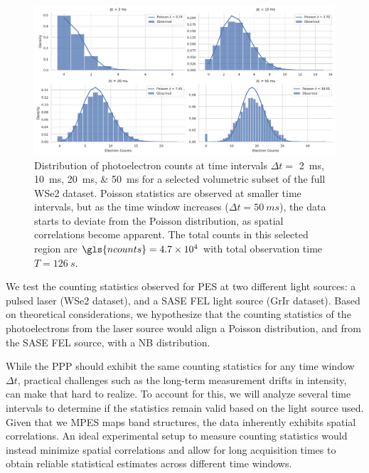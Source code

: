 \begin{figure}
    \centering
    \includegraphics[width=1\linewidth]{images/hist_counts_facetgrid_1_wse2.pdf}
    \caption{Distribution of photoelectron counts at time intervals $\Delta t =$ \qtylist{2;10;20;50}{ms} for a selected volumetric subset of the full \gls{WSe2} dataset. Poisson statistics are observed at smaller time intervals, but as the time window increases ($\Delta t = \qty{50}{ms}$), the data starts to deviate from the Poisson distribution, as spatial correlations become apparent. The total counts in this selected region are $\gls{ncounts}=\num{4.7e4}$ with total observation time $T=\qty{126}{s}$.}
    \label{fig:wse2-stats}
\end{figure}

We test the counting statistics observed for \gls{PES} at two different light sources: a pulsed laser (\gls{WSe2} dataset), and a \gls{SASE} \gls{FEL} light source (\gls{GrIr} dataset). Based on theoretical considerations, we hypothesize that the counting statistics of the photoelectrons from the laser source would align a Poisson distribution, and from the \gls{SASE} \gls{FEL} source, with a \gls{NB} distribution. 

While the \gls{PPP} should exhibit the same counting statistics for any time window $\Delta t$, practical challenges such as the long-term measurement drifts in intensity, can make that hard to realize. To account for this, we will analyze several time intervals to determine if the statistics remain valid based on the light source used. Given that we \gls{MPES} maps band structures, the data inherently exhibits spatial correlations. An ideal experimental setup to measure counting statistics would instead minimize spatial correlations and allow for long acquisition times to obtain reliable statistical estimates across different time windows.

